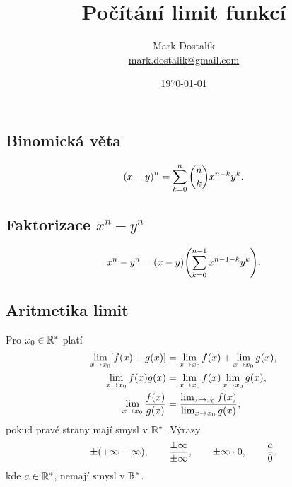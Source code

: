 \documentclass[columns=2]{cheatsheet}
\title{Počítání limit funkcí}
\author{Mark Dostal\'{i}k \\ \href{mailto:mark.dostalik@gmail.com}{mark.dostalik@gmail.com}}
\date{\today}
\begin{document}
\maketitle
\subsection{Binomická věta}
\begin{equation*}
  \parens{x + y}^n = \sum_{k=0}^{n} \binom{n}{k} x^{n - k} y^k.
\end{equation*}

\subsection{Faktorizace $x^n - y^n$}
\begin{equation*}
  x^n - y^n = \parens{x - y} \parens{\sum_{k=0}^{n - 1} x^{n -1 -k} y^k}.
\end{equation*}

\subsection{Aritmetika limit}
Pro $x_0 \in \mathbb{R}^*$ platí
\begin{align*}
  \lim_{x \to x_0} \brackets{f(x) + g(x)}
  &=
  \lim_{x \to x_0} f(x) + \lim_{x \to x_0} g(x),
  \\
  \lim_{x \to x_0} f(x) g(x)
  &=
  \lim_{x \to x_0} f(x) \lim_{x \to x_0} g(x),
  \\
  \lim_{x \to x_0} \frac{f(x)}{g(x)}
  &=
  \frac{\lim_{x \to x_0} f(x)}{\lim_{x \to x_0} g(x)},
\end{align*}
pokud pravé strany mají smysl v $\mathbb{R}^*$. Výrazy
\begin{equation*}
  \pm \parens{+ \infty - \infty}, 
  \qquad 
  \frac{\pm \infty}{\pm \infty},
  \qquad
  \pm \infty \cdot 0,
  \qquad
  \frac{a}{0}.
\end{equation*}
kde $a \in \mathbb{R}^*$, nemají smysl v $\mathbb{R}^*$.

\end{document}
